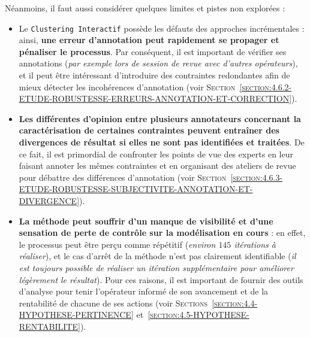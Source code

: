 		Néanmoins, il faut aussi considérer quelques limites et pistes non explorées :
		\begin{itemize}
			\item[\textcolor{colorDarkPastelRed}{\textcolor{colorDarkPastelRed}{\faThumbsDown}}]
				Le \texttt{Clustering Interactif} possède les défauts des approches incrémentales : ainsi, \textbf{une erreur d'annotation peut rapidement se propager et pénaliser le processus}.
				Par conséquent, il est important de vérifier ses annotations (\textit{par exemple lors de session de revue avec d'autres opérateurs}), et il peut être intéressant d'introduire des contraintes redondantes afin de mieux détecter les incohérences d'annotation (voir \textsc{Section~\ref{section:4.6.2-ETUDE-ROBUSTESSE-ERREURS-ANNOTATION-ET-CORRECTION}}).
			\item[\textcolor{colorDarkPastelRed}{\textcolor{colorDarkPastelRed}{\faThumbsDown}}]
				\textbf{Les différentes d'opinion entre plusieurs annotateurs concernant la caractérisation de certaines contraintes peuvent entraîner des divergences de résultat si elles ne sont pas identifiées et traitées}.
				De ce fait, il est primordial de confronter les points de vue des experts en leur faisant annoter les mêmes contraintes et en organisant des ateliers de revue pour débattre des différences d'annotation (voir \textsc{Section~\ref{section:4.6.3-ETUDE-ROBUSTESSE-SUBJECTIVITE-ANNOTATION-ET-DIVERGENCE}}).
			\item[\textcolor{colorDarkPastelRed}{\textcolor{colorDarkPastelRed}{\faThumbsDown}}]
				\textbf{La méthode peut souffrir d'un manque de visibilité et d'une sensation de perte de contrôle sur la modélisation en cours} : en effet, le processus peut être perçu comme répétitif (\textit{environ $145$ itérations à réaliser}), et le cas d'arrêt de la méthode n'est pas clairement identifiable (\textit{il est toujours possible de réaliser un itération supplémentaire pour améliorer légèrement le résultat}).
				Pour ces raisons, il est important de fournir des outils d'analyse pour tenir l'opérateur informé de son avancement et de la rentabilité de chacune de ses actions (voir \textsc{Sections}~\textsc{\ref{section:4.4-HYPOTHESE-PERTINENCE}} et~\textsc{\ref{section:4.5-HYPOTHESE-RENTABILITE}}).
		\end{itemize}
	
	
	\newpage

